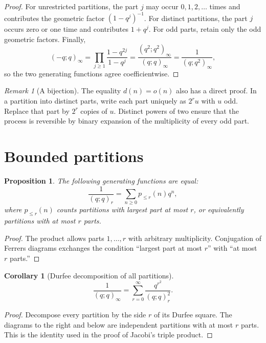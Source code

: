 \documentclass[11pt,a4paper,oneside,openany]{book}
\newtheorem{proposition}[proposition]{Proposition}
\newtheorem{corollary}[corollary]{Corollary}
\theoremstyle{definition}
\theoremstyle{remark}
\newtheorem{remark}[remark]{Remark}
\begin{document}
\begin{proof}
For unrestricted partitions, the part $j$ may occur $0,1,2,\dots$ times and contributes the geometric factor $(1-q^j)^{-1}$.  For distinct partitions, the part $j$ occurs zero or one time and contributes $1+q^j$.  For odd parts, retain only the odd geometric factors.  Finally,
\[
 (-q;q)_\infty
 =\prod_{j\ge1}\frac{1-q^{2j}}{1-q^j}
 =\frac{(q^2;q^2)_\infty}{(q;q)_\infty}
 =\frac1{(q;q^2)_\infty},
\]
so the two generating functions agree coefficientwise.
\end{proof}

\begin{remark}[A bijection]
The equality $d(n)=o(n)$ also has a direct proof.  In a partition into distinct parts, write each part uniquely as $2^ru$ with $u$ odd.  Replace that part by $2^r$ copies of $u$.  Distinct powers of two ensure that the process is reversible by binary expansion of the multiplicity of every odd part.
\end{remark}

\section{Bounded partitions}

\begin{proposition}\label{prop:bounded-partitions}
The following generating functions are equal:
\[
 \frac1{(q;q)_r}
 =\sum_{n\ge0}p_{\le r}(n)q^n,
\]
where $p_{\le r}(n)$ counts partitions with largest part at most $r$, or equivalently partitions with at most $r$ parts.
\end{proposition}

\begin{proof}
The product allows parts $1,\dots,r$ with arbitrary multiplicity.  Conjugation of Ferrers diagrams exchanges the condition ``largest part at most $r$'' with ``at most $r$ parts.''
\end{proof}

\begin{corollary}[Durfee decomposition of all partitions]\label{cor:durfee-all}
\[
 \frac1{(q;q)_\infty}
 =\sum_{r=0}^{\infty}\frac{q^{r^2}}{(q;q)_r^2}.
\]
\end{corollary}

\begin{proof}
Decompose every partition by the side $r$ of its Durfee square.  The diagrams to the right and below are independent partitions with at most $r$ parts.  This is the identity used in the proof of Jacobi's triple product.
\end{proof}
\end{document}
